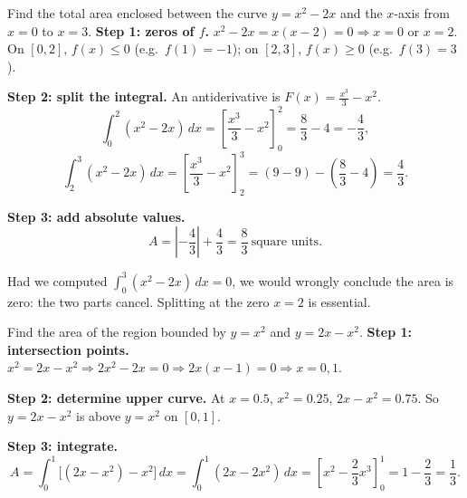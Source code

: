 \documentclass[11pt]{article}
\newcommand{\legende}[1]{\par\vspace{6pt}{\popsemi\fontsize{9}{11.5}\selectfont\color{popmuted}#1}}
\begin{document}
\begin{exemplebox}
Find the total area enclosed between the curve $y = x^2 - 2x$ and the $x$-axis from $x = 0$ to $x = 3$.
\tcblower
\textbf{Step 1: zeros of $f$.} $x^2 - 2x = x(x-2) = 0 \Rightarrow x = 0$ or $x = 2$. On $[0,2]$, $f(x)\le 0$ (e.g.\ $f(1)=-1$); on $[2,3]$, $f(x)\ge 0$ (e.g.\ $f(3)=3$).

\textbf{Step 2: split the integral.} An antiderivative is $F(x) = \frac{x^3}{3} - x^2$.
\[
\int_0^2 (x^2-2x)\,dx = \left[\frac{x^3}{3}-x^2\right]_0^2 = \frac{8}{3}-4 = -\frac{4}{3},
\]
\[
\int_2^3 (x^2-2x)\,dx = \left[\frac{x^3}{3}-x^2\right]_2^3 = (9-9)-\left(\frac{8}{3}-4\right) = \frac{4}{3}.
\]

\textbf{Step 3: add absolute values.}
\[
A = \left|-\frac{4}{3}\right| + \frac{4}{3} = \frac{8}{3}\ \text{square units}.
\]
\begin{attention}
Had we computed $\int_0^3 (x^2-2x)\,dx = 0$, we would wrongly conclude the area is zero: the two parts cancel. Splitting at the zero $x=2$ is essential.
\end{attention}
\end{exemplebox}

\begin{exemplebox}
Find the area of the region bounded by $y = x^2$ and $y = 2x - x^2$.
\tcblower
\textbf{Step 1: intersection points.} $x^2 = 2x - x^2 \Rightarrow 2x^2 - 2x = 0 \Rightarrow 2x(x-1)=0 \Rightarrow x=0, 1$.

\textbf{Step 2: determine upper curve.} At $x=0.5$, $x^2 = 0.25$, $2x-x^2 = 0.75$. So $y = 2x-x^2$ is above $y=x^2$ on $[0,1]$.

\textbf{Step 3: integrate.}
\[
A = \int_0^1 \big[(2x-x^2) - x^2\big]\,dx = \int_0^1 (2x - 2x^2)\,dx = \left[x^2 - \frac{2}{3}x^3\right]_0^1 = 1 - \frac{2}{3} = \frac{1}{3}.
\]
\end{exemplebox}

\begin{popfigure}
\legende{Area between $y=x^2$ and $y=2x-x^2$}
\end{popfigure}
\end{document}
